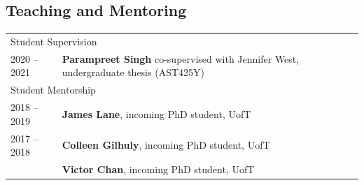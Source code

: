 \documentclass[10pt]{res} %
\begin{document}
\begin{resume}
\section{\Large Teaching and Mentoring}
\vspace{-5pt} %
\noindent\makebox[\linewidth]{\rule{\textwidth}{0.4pt}}
\vspace{-20pt} %
\begin{table}[h!]
\begin{tabularx}{\textwidth}{ @{} p{6.5em} X @{} }
% 
% 
\multicolumn{2}{l}{ \rule{0pt}{3ex} \large \hspace{-12pt} Student Supervision \dotfill \rule[-1.2ex]{0pt}{0pt}} \\
2020 -- 2021 & \textbf{Parampreet Singh} co-supervised with Jennifer West, undergraduate thesis (AST425Y) \\
% 
% 
\multicolumn{2}{l}{ \rule{0pt}{3ex} \large \hspace{-12pt} Student Mentorship \dotfill \rule[-1.2ex]{0pt}{0pt}} \\
2018 -- 2019 & \textbf{James Lane}, incoming PhD student, UofT \\
2017 -- 2018 & \textbf{Colleen Gilhuly}, incoming PhD student, UofT \\
                     & \textbf{Victor Chan}, incoming PhD student, UofT 
\end{tabularx}
\end{table}



\end{resume}
\end{document}
